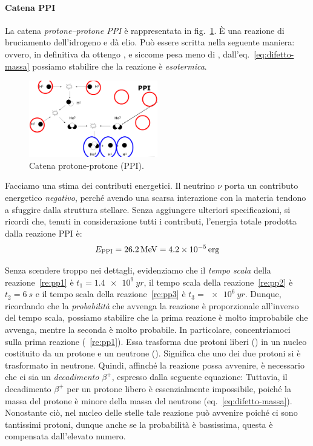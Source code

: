 \paragraph{Catena PPI}
La catena \emph{protone--protone PPI} è rappresentata in fig.~\ref{fig:catena-pp1}. È una reazione di bruciamento dell'idrogeno e dà elio. Può essere scritta nella seguente maniera:
ovvero, in definitiva da  ottengo , e siccome  pesa meno di , dall'eq.~\eqref{eq:difetto-massa} possiamo stabilire che la reazione è \emph{esotermica}.

\begin{figure}
    \centering
    \includegraphics[width=0.5\textwidth]{immagini/catena-pp1.png}
    \caption{Catena protone-protone (PPI).}
    \label{fig:catena-pp1}
\end{figure}

Facciamo una stima dei contributi energetici. Il neutrino $\nu$ porta un contributo energetico \emph{negativo}, perché avendo una scarsa interazione con la materia tendono a sfuggire dalla struttura stellare. Senza aggiungere ulteriori specificazioni, si ricordi che, tenuti in considerazione tutti i contributi, l'energia totale prodotta dalla reazione PPI è:
\begin{equation}\label{eq:energia-pp1}
    E_\textup{PPI} = \SI{26.2}{MeV} = \SI{4.2e-5}{erg}
\end{equation}

Senza scendere troppo nei dettagli, evidenziamo che il \emph{tempo scala} della reazione~\ref{re:pp1} è $t_1 = \SI{1.4e9}{yr}$, il tempo scala della reazione~\ref{re:pp2} è $t_2 = \SI{6}{s}$ e il tempo scala della reazione~\ref{re:pp3} è $t_3 = \SI{e6}{yr}$. Dunque, ricordando che la \emph{probabilità} che avvenga la reazione è proporzionale all'inverso del tempo scala, possiamo stabilire che la prima reazione è molto improbabile che avvenga, mentre la seconda è molto probabile. In particolare, concentriamoci sulla prima reazione (~\ref{re:pp1}). Essa trasforma due protoni liberi () in un nucleo costituito da un protone e un neutrone (). Significa che uno dei due protoni si è trasformato in neutrone. Quindi, affinché la reazione possa avvenire, è necessario che ci sia un \emph{decadimento $\beta^+$}, espresso dalla seguente equazione:
Tuttavia, il decadimento $\beta^+$ per un protone libero è essenzialmente impossibile, poiché la massa del protone è minore della massa del neutrone (eq.~\eqref{eq:difetto-massa}). Nonostante ciò, nel nucleo delle stelle tale reazione può avvenire poiché ci sono tantissimi protoni, dunque anche se la probabilità è bassissima, questa è compensata dall'elevato numero. 

